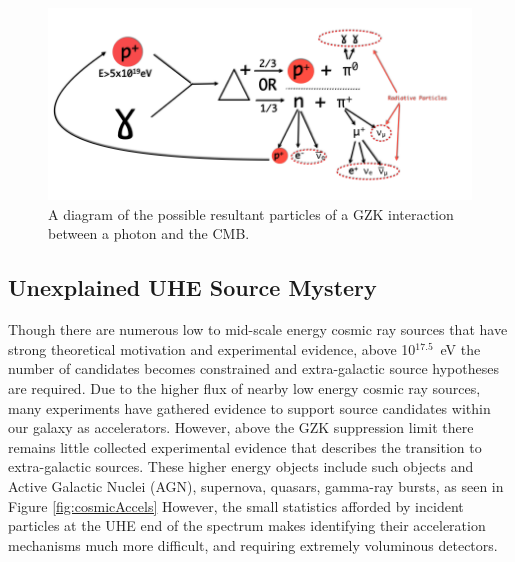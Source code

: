\noindent		
\begin{figure}
	\includegraphics[width=\textwidth]{figures/GZKDiagram}
	\caption{A diagram of the possible resultant particles of a GZK interaction between a photon and the CMB.}
	\label{fig:GZKDiagram}
\end{figure}
			
		
	\subsection{Unexplained UHE Source Mystery}
		Though there are numerous low to mid-scale energy cosmic ray sources that have strong theoretical motivation and experimental evidence, above 10$^{17.5}$~eV the number of candidates becomes constrained and extra-galactic source hypotheses are required. \cite{RevModPhys.71.S33}  Due to the higher flux of nearby low energy cosmic ray sources, many experiments have gathered evidence to support source candidates within our galaxy as accelerators.  However, above the GZK suppression limit there remains little collected experimental evidence that describes the transition to extra-galactic sources. These higher energy objects include such objects and Active Galactic Nuclei (AGN), supernova, quasars, gamma-ray bursts, as seen in Figure \ref{fig:cosmicAccels}  However, the small statistics afforded by incident particles at the UHE end of the spectrum makes identifying their acceleration mechanisms much more difficult, and requiring extremely voluminous detectors.

